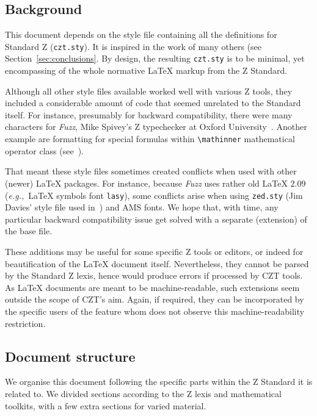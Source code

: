 \documentclass{article}
\newcommand{\emfile}[1]{\texttt{#1}}%
\begin{document}
\subsection{Background}\label{sec:intro-background}

This document depends on the style file containing all the definitions for Standard Z
(\emfile{czt.sty}). It is inspired in the work of many others (see Section~\ref{sec:conclusions}.
By design, the resulting \emfile{czt.sty} is to be minimal, yet encompassing of the
whole normative \LaTeX{} markup from the Z Standard.

Although all other style files available worked well with various Z tools,
they included a considerable amount of code that seemed unrelated to the Standard itself. For instance,
presumably for backward compatibility, there were many characters for \textit{Fuzz},
Mike Spivey's Z typechecker at Oxford University~\cite{zrm}. Another example are formatting for
special formulas within \verb|\mathinner| mathematical operator class (see~\cite[8.9]{latexcomp}).

That meant these style files sometimes created conflicts when used with other (newer) \LaTeX{} packages.
For instance, because \textit{Fuzz} uses rather old \LaTeX{} $2.09$ (\textit{e.g.,}~\LaTeX{} symbols
font \texttt{lasy}), some conflicts arise when using \emfile{zed.sty} (Jim Davies' style file
used in~\cite{usingz}) and AMS fonts. We hope that, with time, any particular backward compatibility
issue get solved with a separate (extension) of the base \cztstylefile{} file.

These additions may be useful for some specific Z tools or editors, or indeed for
beautification of the \LaTeX{} document itself. Nevertheless, they cannot be parsed
by the Standard Z lexis, hence would produce errors if processed by CZT tools. As
\LaTeX{} documents are meant to be machine-readable, such extensions seem outside
the scope of CZT's aim. Again, if required, they can be incorporated by the specific
users of the feature whom does not observe this machine-readability restriction.

\subsection{Document structure}\label{sec:intro-struct}

We organise this document following the specific parts within the Z Standard it is related to.
We divided sections according to the Z lexis and mathematical toolkits, with a few extra
sections for varied material.
\end{document}
